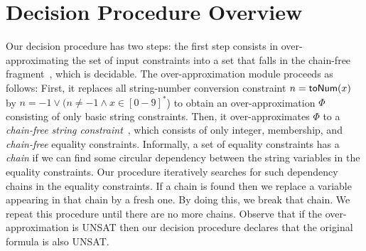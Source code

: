 \documentclass[sigplan,review,anonymous]{acmart}\settopmatter{printfolios=true,printccs=false,printacmref=false}
\begin{document}
%	
%	
%	
%
%

\section{Decision Procedure Overview} \label{section:over}


Our decision procedure has two steps: the first step consists in over-approximating the set of input constraints into a set that falls in the chain-free fragment~\cite{abdulla2019chain}, which is decidable. 
The over-approximation module proceeds as follows: First,  it replaces all string-number conversion constraint $n=\mbox{\textsf{toNum}($x$)}$ by $n=-1 \vee (n\neq -1 \wedge x\in [0-9]^*$) to obtain an over-approximation $\Phi$ consisting of only basic string constraints. 
Then, it over-approximates $\Phi$ to a \emph{chain-free string constraint}~\cite{abdulla2019chain}, 
which  consists of only integer, membership, and \emph{chain-free} equality constraints. Informally, a set of equality constraints has a \emph{chain} if we can find some circular dependency between the string variables in the equality constraints.
Our procedure iteratively searches for such dependency chains in the equality constraints. If a chain is found then we replace a variable appearing in that chain by a  fresh one. By doing this, we  break  that chain. We   repeat this procedure until there are no more chains. Observe that if the over-approximation is UNSAT then our decision procedure  declares that the original formula is also UNSAT.
\end{document}
